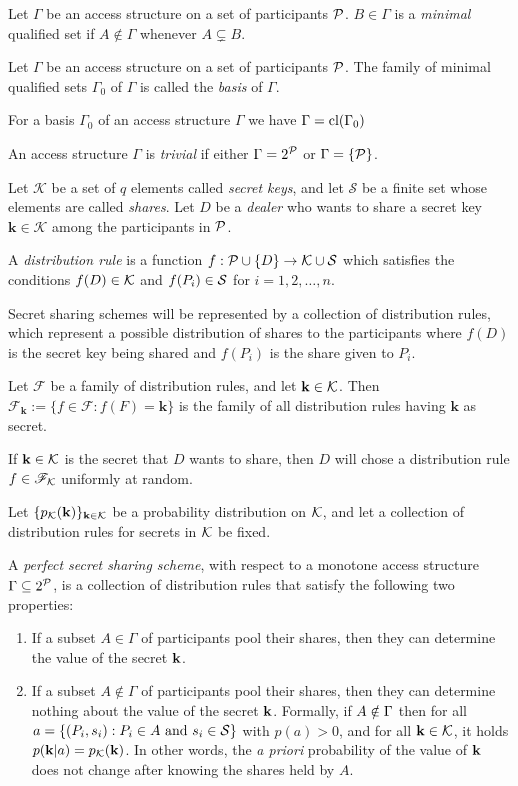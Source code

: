  Let $\Gamma$ be an access structure on a set of participants ${\mathcal P}$. $B \in \Gamma$ is a \textit{minimal} qualified set if $A \notin \Gamma$ whenever $A \subsetneq B$.

 Let $\Gamma$ be an access structure on a set of participants ${\mathcal P}$. The family of minimal qualified sets $\Gamma_{0}$ of $\Gamma$ is called the \textit{basis} of $\Gamma$.

For a basis $\Gamma_0$ of an access structure $\Gamma$ we have $\Gamma = \text{cl} (\Gamma_{0})$

 An access structure $\Gamma$ is \textit{trivial} if either $\Gamma = 2^{{\mathcal P}}$ or $\Gamma = \{ {\mathcal P} \}$.

Let $\mathcal{K}$ be a set of $q$ elements called \textit{secret keys}, and let $\mathcal{S}$ be a finite set whose elements are called \textit{shares}. Let $D$ be a \textit{dealer} who wants to share a secret key $\mathbf{k} \in \mathcal{K}$ among the participants in ${\mathcal P}$. 

 A \textit{distribution rule} is a function $f : {\mathcal P} \cup \{ D \} \rightarrow \mathcal{K} \cup \mathcal{S}$ which satisfies the conditions $f(D) \in \mathcal{K}$ and $f(P_i) \in \mathcal{S}$ for $i = 1,2, \dots, n$.

Secret sharing schemes will be represented by a collection of distribution rules, which represent a possible distribution of shares to the participants where $f(D)$ is the secret key being shared and $f(P_i)$ is the share given to $P_i$.

 Let $\mathscr{F}$ be a family of distribution rules, and let $\mathbf{k} \in \mathcal{K}$. Then $\mathscr{F}_{\mathbf{k}} := \{ f \in \mathscr{F} : f(F) = \mathbf{k}\}$ is the family of all distribution rules having $\mathbf{k}$ as secret.

If $\mathbf{k} \in \mathcal{K}$ is the secret that $D$ wants to share, then $D$ will chose a distribution rule $f \in {\mathscr F}_{\mathcal{K}}$ uniformly at random.


Let $\{p_{\mathcal{K}} (\mathbf{k}) \}_{\mathbf{k} \in \mathcal{K}}$ be a probability distribution on $\mathcal{K}$, and let a collection of distribution rules for secrets in $\mathcal{K}$ be fixed.

 A \textit{perfect secret sharing scheme}, with respect to a monotone access structure $\Gamma \subseteq 2^{{\mathcal P}}$, is a collection of distribution rules that satisfy the following two properties:
\begin{enumerate}
    \item If a subset $A \in \Gamma$ of participants pool their shares, then they can determine the value of the secret $\mathbf{k}$.
    \item If a subset $A \notin \Gamma$ of participants pool their shares, then they can determine nothing about the value of the secret $\mathbf{k}$. Formally, if $A \notin \Gamma$ then for all $a = \{ (P_i, s_i): P_i \in A \text{ and } s_i \in \mathcal{S} \}$ with $p(a)>0$, and for all $\mathbf{k} \in \mathcal{K}$, it holds $p(\mathbf{k} \vert a) = p_{\mathcal{K}}(\mathbf{k})$. In other words, the \textit{a priori} probability of the value of $\mathbf{k}$ does not change after knowing the shares held by $A$.
\end{enumerate}

